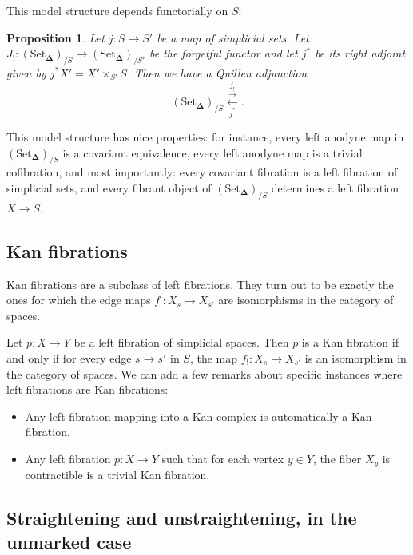 \documentclass{amsart}
\newcommand{\8}{\ensuremath{\infty}}
\newcommand{\SSet}{\ensuremath{\text{Set}_{\boldsymbol{\Delta}}}}
\newtheorem{proposition}{Proposition}
\begin{document}
This model structure depends functorially on $S$:
\begin{proposition}
  Let $j:S\rightarrow S'$ be a map of simplicial sets. Let $J_!: (\SSet)_{/S}\rightarrow (\SSet)_{/S'}$ be the forgetful functor and let $j^*$ be its right adjoint given by $j^*X' = X'\times_{S'} S$. Then we have a Quillen adjunction 
  \[(\SSet)_{/S}\underset{j^*}{\overset{j_!}{\overset{\rightarrow}{\leftarrow}}}.\]
\end{proposition}

This model structure has nice properties: for instance, every left anodyne map in $(\SSet)_{/S}$ is a covariant equivalence, every left anodyne map is a trivial cofibration, and most importantly: every covariant fibration is a left fibration of simplicial sets, and every fibrant object of $(\SSet)_{/S}$ determines a left fibration $X\rightarrow S$.

\subsection{Kan fibrations}
Kan fibrations are a subclass of left fibrations. They turn out to be exactly the ones for which the edge maps $f_!:X_s\rightarrow X_{s'}$ are isomorphisms in the category of spaces.

Let $p:X\rightarrow Y$ be a left fibration of simplicial spaces. Then $p$ is a Kan fibration if and only if for every edge $s\rightarrow s'$ in $S$, the map $f_!:X_s\rightarrow X_{s'}$ is an isomorphism in the category of spaces.
We can add a few remarks about specific instances where left fibrations are Kan fibrations:
\begin{itemize}
  \item Any left fibration mapping into a Kan complex is automatically a Kan fibration.
  \item Any left fibration $p:X\rightarrow Y$ such that for each vertex $y\in Y$, the fiber $X_y$ is contractible is a trivial Kan fibration.
\end{itemize}


\subsection{Straightening and unstraightening, in the unmarked case}
\end{document}
